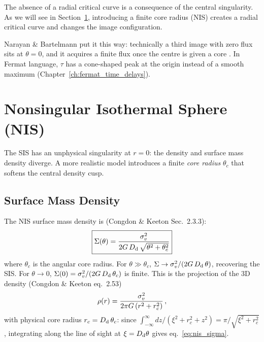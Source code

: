 \begin{remark}
The absence of a radial critical curve is a consequence of the
central singularity.  As we will see in Section~\ref{sec:nis},
introducing a finite core radius (NIS) creates a radial critical
curve and changes the image configuration.
\end{remark}

\begin{annotation}
Narayan \& Bartelmann put it this way: technically a third image with zero
flux sits at $\theta = 0$, and it acquires a finite flux once the centre is
given a core \citep[Sect.~3.1]{narayan_lectures_1997}.  In Fermat language,
$\tau$ has a cone-shaped peak at the origin instead of a smooth maximum
(Chapter~\ref{ch:fermat_time_delays}).
\end{annotation}


\section{Nonsingular Isothermal Sphere (NIS)}
\label{sec:nis}

The SIS has an unphysical singularity at $r = 0$: the density and
surface mass density diverge.  A more realistic model introduces a
finite \emph{core radius} $\theta_c$ that softens the central
density cusp.

\subsection{Surface Mass Density}

The NIS surface mass density is
(Congdon \& Keeton Sec.~2.3.3):
\begin{equation}
    \boxed{
    \Sigma(\theta) = \frac{\sigma_v^2}{2G\, D_{\mathrm{d}}\,
    \sqrt{\theta^2 + \theta_c^2}}
    }
    \label{eq:nis_sigma}
\end{equation}
where $\theta_c$ is the angular core radius.  For $\theta \gg \theta_c$,
$\Sigma \to \sigma_v^2 / (2G\, D_{\mathrm{d}}\, \theta)$, recovering
the SIS\@.  For $\theta \to 0$,
$\Sigma(0) = \sigma_v^2 / (2G\, D_{\mathrm{d}}\, \theta_c)$ is finite.
This is the projection of the 3D density
(Congdon \& Keeton eq.~2.53)
\begin{equation}
    \rho(r) = \frac{\sigma_v^2}{2\pi G\,(r^2 + r_c^2)} \,,
    \label{eq:nis_rho}
\end{equation}
with physical core radius $r_c = D_{\mathrm{d}}\,\theta_c$: since
$\int_{-\infty}^{\infty} dz/(\xi^2 + r_c^2 + z^2) = \pi/\sqrt{\xi^2 + r_c^2}$,
integrating along the line of sight at $\xi = D_{\mathrm{d}}\theta$ gives
eq.~\eqref{eq:nis_sigma}.

